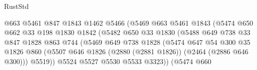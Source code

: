 \begin{lexlean}{RustStd}
\begin{coremodule}
                                    @663
                                    @5461
                                    @847
                                    @1843
                                    @1462
                                    @5466
                                    (@5469
                                      @663
                                      @5461
                                      @1843
                                      (@5474
                                        @650
                                        @662
                                        @33
                                        @198
                                        @1830
                                        @1842
                                        (@5482
                                          @650
                                          @33
                                          @1830
                                          (@5488
                                            @649
                                            @738
                                            @33
                                            @847
                                            @1828
                                            @863
                                            @744
                                            (@5469
                                              @649
                                              @738
                                              @1828
                                              (@5474
                                                @647
                                                @54
                                                @300
                                                @35
                                                @1826
                                                @860
                                                (@5507
                                                  @646
                                                  @1826
                                                  (@2880 (@2881 @1826))
                                                  (@2464 (@2886 @646 @300)))
                                                @5519))
                                            @5524
                                            @5527
                                            @5530
                                            @5533
                                            @3323))
                                        (@5474
                                          @660

\end{coremodule}
\end{lexlean}
